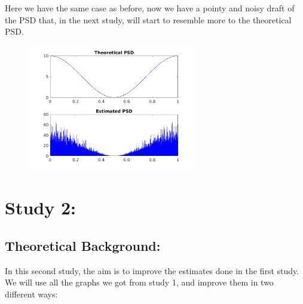 \documentclass[a4paper,11pt]{article}
\begin{document}
Here we have the same case as before, now we have a pointy and noisy draft of
the PSD that, in the next study, will start to resemble more to the theoretical
PSD.

\begin{figure}[!hp]
    \begin{center}
      \includegraphics[width=0.65\textwidth]{images/study1/comp_R_ld.png}
    \end{center}
\end{figure}

\newpage

\section{Study 2:}

\subsection{Theoretical Background:}

In this second study, the aim is to improve the estimates done in the first
study. We will use all the graphs we got from study 1, and improve them in two
different ways:
\end{document}

